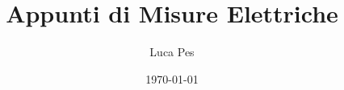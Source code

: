 \documentclass[12pt, a4paper]{article}
\begin{document}
\title{Appunti di Misure Elettriche}
\author{Luca Pes}
\date{\today}
\maketitle

\newpage

\tableofcontents
\thispagestyle{fancy}


\end{document}
